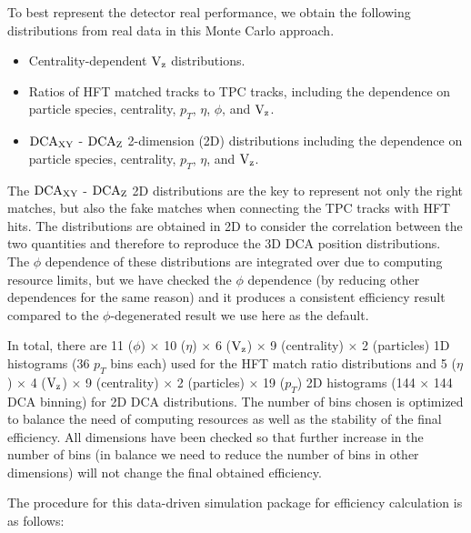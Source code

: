 \documentclass[%
 reprint,	
 amsmath,amssymb,
 aps,
 prc,
]{revtex4-1}
\begin{document}
To best represent the detector real performance, we obtain the following distributions from real data in this Monte Carlo approach.
\begin{itemize}
\item Centrality-dependent $\textup{V}_\textup{z}$ distributions.
\item Ratios of HFT matched tracks to TPC tracks, including the dependence on particle species, centrality, $p_T$, $\eta$, $\phi$, and $\textup{V}_\textup{z}$.
\item $\textup{DCA}_{\textup{XY}}$ - $\textup{DCA}_{\textup{Z}}$ 2-dimension (2D) distributions including the dependence on particle species, centrality, $p_T$, $\eta$, and $\textup{V}_\textup{z}$.
\end{itemize}
The $\textup{DCA}_{\textup{XY}}$ - $\textup{DCA}_{\textup{Z}}$ 2D distributions are the key to represent not only the right matches, but also the fake matches when connecting the TPC tracks with HFT hits. The distributions are obtained in 2D to consider the correlation between the two quantities and therefore to reproduce the 3D DCA position distributions. The $\phi$ dependence of these distributions are integrated over due to computing resource limits, but we have checked the $\phi$ dependence (by reducing other dependences for the same reason) and it produces a consistent efficiency result compared to the $\phi$-degenerated result we use here as the default.

In total, there are 11 ($\phi$) $\times$ 10 ($\eta$) $\times$ 6 ($\textup{V}_\textup{z}$) $\times$ 9 (centrality) $\times$ 2 (particles) 1D histograms (36 $p_T$ bins each) used for the HFT match ratio distributions and 5 ($\eta$) $\times$ 4 ($\textup{V}_\textup{z}$) $\times$ 9 (centrality) $\times$ 2 (particles) $\times$ 19 ($p_T$) 2D histograms (144 $\times$ 144 DCA binning) for 2D DCA distributions. The number of bins chosen is optimized to balance the need of computing resources as well as the stability of the final efficiency. All dimensions have been checked so that further increase in the number of bins (in balance we need to reduce the number of bins in other dimensions)  will not change the final obtained efficiency.

The procedure for this data-driven simulation package for efficiency calculation is as follows:
\end{document}

